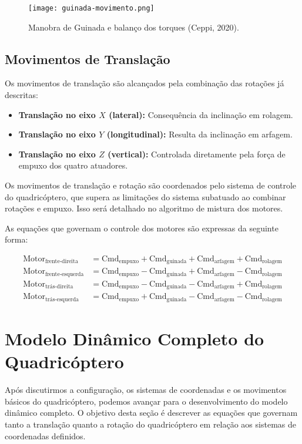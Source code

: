 \begin{figure}[H]
	\centering
	\texttt{[image: guinada-movimento.png]}
	\caption{Manobra de Guinada e balanço dos torques (Ceppi, 2020).}
	\label{fig:yaw_maneuver_torques}
\end{figure}

\subsection{Movimentos de Translação}
Os movimentos de translação são alcançados pela combinação das rotações já descritas:

\begin{itemize}
	\item \textbf{Translação no eixo \(X\) (lateral):} Consequência da inclinação em rolagem.
	\item \textbf{Translação no eixo \(Y\) (longitudinal):} Resulta da inclinação em arfagem.
	\item \textbf{Translação no eixo \(Z\) (vertical):} Controlada diretamente pela força de empuxo dos quatro atuadores.
\end{itemize}

Os movimentos de translação e rotação são coordenados pelo sistema de controle do quadricóptero, que supera as limitações do sistema subatuado ao combinar rotações e empuxo. Isso será detalhado no algoritmo de mistura dos motores.

As equações que governam o controle dos motores são expressas da seguinte forma:

\begin{align}
	\text{Motor}_{\text{frente-direita}} &= \text{Cmd}_{\text{empuxo}} + \text{Cmd}_{\text{guinada}} + \text{Cmd}_{\text{arfagem}} + \text{Cmd}_{\text{rolagem}} \tag{2} \\
	\text{Motor}_{\text{frente-esquerda}} &= \text{Cmd}_{\text{empuxo}} - \text{Cmd}_{\text{guinada}} + \text{Cmd}_{\text{arfagem}} - \text{Cmd}_{\text{rolagem}} \tag{3} \\
	\text{Motor}_{\text{trás-direita}} &= \text{Cmd}_{\text{empuxo}} - \text{Cmd}_{\text{guinada}} - \text{Cmd}_{\text{arfagem}} + \text{Cmd}_{\text{rolagem}} \tag{4} \\
	\text{Motor}_{\text{trás-esquerda}} &= \text{Cmd}_{\text{empuxo}} + \text{Cmd}_{\text{guinada}} - \text{Cmd}_{\text{arfagem}} - \text{Cmd}_{\text{rolagem}} \tag{5}
\end{align}

\section{Modelo Dinâmico Completo do Quadricóptero}
Após discutirmos a configuração, os sistemas de coordenadas e os movimentos básicos do quadricóptero, podemos avançar para o desenvolvimento do modelo dinâmico completo. O objetivo desta seção é descrever as equações que governam tanto a translação quanto a rotação do quadricóptero em relação aos sistemas de coordenadas definidos.

